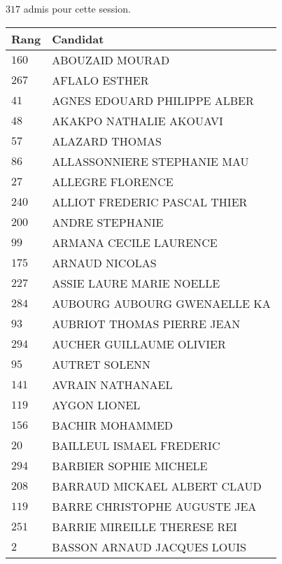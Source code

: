 




  $317$ admis pour cette session.

  \begin{xltabular}{\linewidth}{|l|X|}
    \hline
    \textbf{Rang} & \textbf{Candidat} \\
    \hline
    $160$ & ABOUZAID MOURAD \\
    \hline
    $267$ & AFLALO ESTHER \\
    \hline
    $41$ & AGNES EDOUARD PHILIPPE ALBER \\
    \hline
    $48$ & AKAKPO NATHALIE AKOUAVI \\
    \hline
    $57$ & ALAZARD THOMAS \\
    \hline
    $86$ & ALLASSONNIERE STEPHANIE MAU \\
    \hline
    $27$ & ALLEGRE FLORENCE \\
    \hline
    $240$ & ALLIOT FREDERIC PASCAL THIER \\
    \hline
    $200$ & ANDRE STEPHANIE \\
    \hline
    $99$ & ARMANA CECILE LAURENCE \\
    \hline
    $175$ & ARNAUD NICOLAS \\
    \hline
    $227$ & ASSIE LAURE MARIE NOELLE \\
    \hline
    $284$ & AUBOURG AUBOURG GWENAELLE KA \\
    \hline
    $93$ & AUBRIOT THOMAS PIERRE JEAN \\
    \hline
    $294$ & AUCHER GUILLAUME OLIVIER \\
    \hline
    $95$ & AUTRET SOLENN \\
    \hline
    $141$ & AVRAIN NATHANAEL \\
    \hline
    $119$ & AYGON LIONEL \\
    \hline
    $156$ & BACHIR MOHAMMED \\
    \hline
    $20$ & BAILLEUL ISMAEL FREDERIC \\
    \hline
    $294$ & BARBIER SOPHIE MICHELE \\
    \hline
    $208$ & BARRAUD MICKAEL ALBERT CLAUD \\
    \hline
    $119$ & BARRE CHRISTOPHE AUGUSTE JEA \\
    \hline
    $251$ & BARRIE MIREILLE THERESE REI \\
    \hline
    $2$ & BASSON ARNAUD JACQUES LOUIS \\
    \hline

\end{xltabular}
